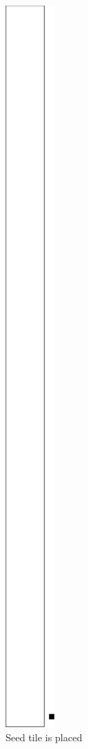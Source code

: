 \documentclass[10pt]{article}
\begin{document}
\begin{figure}
    \centering

    \begin{subfigure}[t]{0.14\textwidth}
        \centering
        \includegraphics[width=.45in,valign=t]{mid_level_1digit_msr_phase_1}
        \caption{\label{fig:mid_level_1digit_msr_phase_1} Seed tile is placed }
    \end{subfigure} %
    ~
    \begin{subfigure}[t]{0.14\textwidth}
        \centering

\end{subfigure}
\end{figure}
\end{document}
